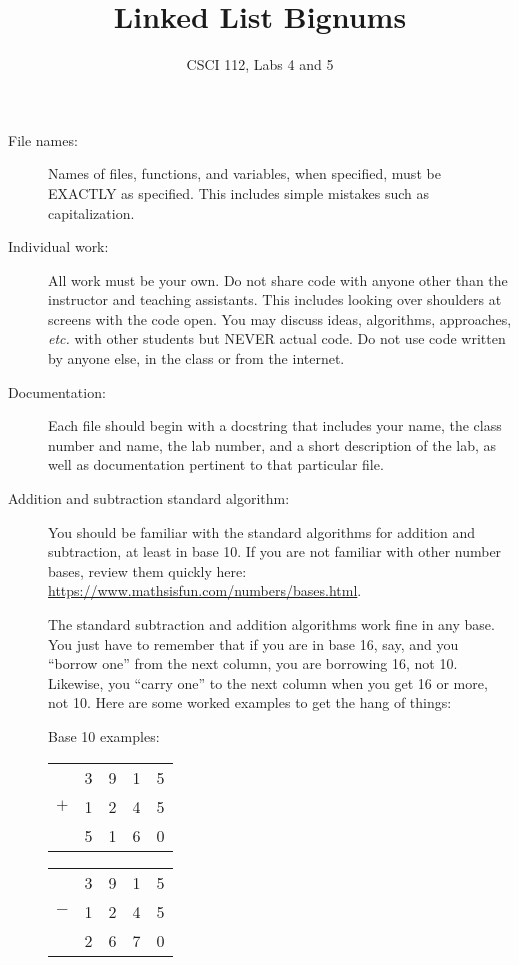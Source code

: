 \documentclass{article}
\title{Linked List Bignums}
\author{CSCI 112, Labs 4 and 5}
\date{}
\begin{document}
\sloppy

\maketitle

\begin{description} 
\item[File names:]  Names of files, functions, and variables, 
when specified,
must be EXACTLY as specified.  This includes simple mistakes such
as capitalization.

\item[Individual work:]  All work must be your own.  Do not share
code with anyone other than the instructor and teaching assistants.
This includes looking over shoulders at screens with the code open.
You may discuss ideas, algorithms, approaches, {\em etc.} with
other students but NEVER actual code.  Do not use code
written by anyone else, in the class or from the internet.

\item[Documentation:] Each file should begin with a docstring
that includes your name, the class number and name, the lab
number, and  
a short description of the lab, as well as documentation pertinent
to that particular file.

\item[Addition and subtraction standard algorithm:]  You should be
familiar with the standard algorithms for addition and subtraction,
at least in base 10.  If you are not familiar with other number bases,
review them quickly here: \url{https://www.mathsisfun.com/numbers/bases.html}.

The standard subtraction and addition algorithms work fine in any
base.  You just have to remember that if you are in base 16, say,
and you ``borrow one'' from the next column, you are borrowing 16,
not 10.  Likewise, you ``carry one'' to the next column when you
get 16 or more, not 10.  Here are some worked examples to get
the hang of things:

Base 10 examples:\hfill
\begin{tabular}{rrrrr}
  &3 &9 &1 &5\\
$+$ &1 &2 &4 &5\\
\hline
  &5 &1 &6 &0\\
\end{tabular}\hfill
\begin{tabular}{rrrrr}
  &3 &9 &1 &5\\
$-$ &1 &2 &4 &5\\
\hline
  &2 &6 &7 &0\\
\end{tabular}


\end{description}
\end{document}
